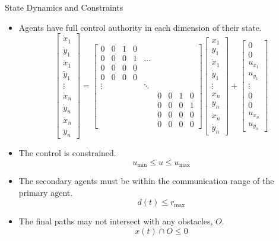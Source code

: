 \documentclass[9pt]{beamer}
\begin{document}
\begin{frame}[t]{State Dynamics and Constraints}

\begin{itemize}
  \item Agents have full control authority in each dimension of their state.
  \[ \begin{bmatrix} \dot{x}_1 \\ \dot{y}_1 \\ \ddot{x}_1 \\ \ddot{y}_1 \\ \vdots \\ \dot{x}_n \\ \dot{y}_n \\ \ddot{x}_n \\ \ddot{y}_n \end{bmatrix}= \begin{bmatrix} 0 & 0 & 1 & 0 \\ 0 & 0 & 0 & 1 & \dots \\ 0 & 0 & 0 & 0 \\ 0 & 0 & 0 & 0 \\ \vdots & & & & \ddots \\ & & & & & 0 & 0 & 1 & 0 \\ & & & & & 0 & 0 & 0 & 1 \\& & & & &  0 & 0 & 0 & 0 \\& & & & &  0 & 0 & 0 & 0 \end{bmatrix} \begin{bmatrix} x_1 \\ y_1 \\ \dot{x}_1 \\ \dot{y}_1 \\ \vdots \\ x_n \\ y_n \\ \dot{x}_n \\ \dot{y}_n \end{bmatrix} + \begin{bmatrix} 0 \\ 0 \\ u_{x_1} \\ u_{y_1} \\ \vdots \\ 0 \\ 0 \\ u_{x_n} \\ u_{y_n}\end{bmatrix}\]
  \item The control is constrained.
  \[ u_{\text{min}} \leq u \leq u_{\text{max}} \]
  \item The secondary agents must be within the communication range of the primary agent.
  \[ d(t) \leq r_{\text{max}} \]
  \item The final paths may not intersect with any obstacles, $O$.
  \[ x(t) \cap O \leq 0\]
\end{itemize}

\end{frame}
\end{document}
